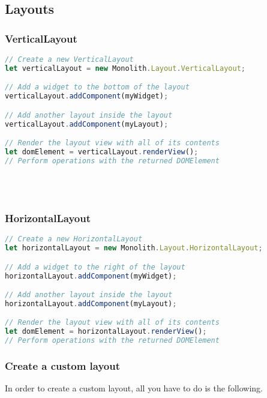 \subsection{Layouts}
\subsubsection{VerticalLayout}
\begin{lstlisting}[language=JavaScript]
// Create a new VerticalLayout
let verticalLayout = new Monolith.Layout.VerticalLayout;

// Add a widget to the bottom of the layout
verticalLayout.addComponent(myWidget);

// Add another layout inside the layout
verticalLayout.addComponent(myLayout);

// Render the layout view with all of its contents
let domElement = verticalLayout.renderView();
// Perform operations with the returned DOMElement
\end{lstlisting}
~\\~\\

\subsubsection{HorizontalLayout}
\begin{lstlisting}[language=JavaScript]
// Create a new HorizontalLayout
let horizontalLayout = new Monolith.Layout.HorizontalLayout;

// Add a widget to the right of the layout
horizontalLayout.addComponent(myWidget);

// Add another layout inside the layout
horizontalLayout.addComponent(myLayout);

// Render the layout view with all of its contents
let domElement = horizontalLayout.renderView();
// Perform operations with the returned DOMElement
\end{lstlisting}

\newpage
\subsubsection{Create a custom layout}
In order to create a custom layout, all you have to do is the following.  

